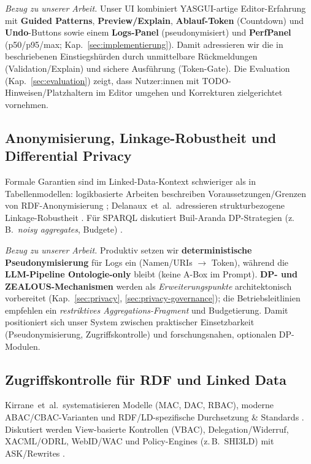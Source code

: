 \textit{Bezug zu unserer Arbeit.} Unser UI kombiniert YASGUI-artige Editor-Erfahrung mit \textbf{Guided Patterns}, \textbf{Preview/Explain}, \textbf{Ablauf-Token} (Countdown) und \textbf{Undo}-Buttons sowie einem \textbf{Logs-Panel} (pseudonymisiert) und \textbf{PerfPanel} (p50/p95/max; Kap.~\ref{sec:implementierung}). Damit adressieren wir die in \cite{kuric-usability} beschriebenen Einstiegshürden durch unmittelbare Rückmeldungen (Validation/Explain) und sichere Ausführung (Token-Gate). Die Evaluation (Kap.~\ref{sec:evaluation}) zeigt, dass Nutzer:innen mit TODO-Hinweisen/Platzhaltern im Editor umgehen und Korrekturen zielgerichtet vornehmen.

\subsection{Anonymisierung, Linkage-Robustheit und Differential Privacy}
Formale Garantien sind im Linked-Data-Kontext schwieriger als in Tabellenmodellen: logikbasierte Arbeiten beschreiben Voraussetzungen/Grenzen von RDF-Anonymisierung \cite{logical-foundations-lda}; Delanaux~et~al.\ adressieren strukturbezogene Linkage-Robustheit \cite{delanaux-linkage}. Für SPARQL diskutiert Buil-Aranda DP-Strategien (z.\,B.\ \emph{noisy aggregates}, Budgete) \cite{builaranda-dp-sparql}.

\textit{Bezug zu unserer Arbeit.} Produktiv setzen wir \textbf{deterministische Pseudonymisierung} für Logs ein (Namen/URIs {\(\rightarrow\)} Token), während die \textbf{LLM-Pipeline Ontologie-only} bleibt (keine A-Box im Prompt). \textbf{DP- und ZEALOUS-Mechanismen} werden als \emph{Erweiterungspunkte} architektonisch vorbereitet (Kap.~\ref{sec:privacy}, \ref{sec:privacy-governance}); die Betriebsleitlinien empfehlen ein \emph{restriktives Aggregations-Fragment} und Budgetierung. Damit positioniert sich unser System zwischen praktischer Einsetzbarkeit (Pseudonymisierung, Zugriffskontrolle) und forschungsnahen, optionalen DP-Modulen.

\subsection{Zugriffskontrolle für RDF und Linked Data}
Kirrane~et~al.\ systematisieren Modelle (MAC, DAC, RBAC), moderne ABAC/CBAC-Varianten und RDF/LD-spezifische Durchsetzung \& Standards \cite{kirrane-ac-survey}. Diskutiert werden View-basierte Kontrollen (VBAC), Delegation/Widerruf, XACML/ODRL, WebID/WAC und Policy-Engines (z.\,B.\ SHI3LD) mit ASK/Rewrites \cite{kirrane-ac-survey}.

